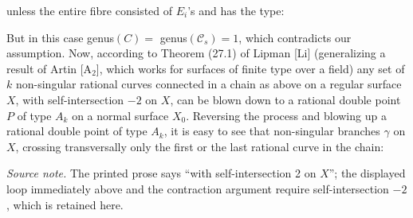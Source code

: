 \documentclass[10pt]{article}
\begin{document}
\begin{center}
\end{center}

unless the entire fibre consisted of $E_i$'s and has the type:

\begin{center}
\end{center}

But in this case genus$(C)=$ genus$(\mathscr C_s)=1$, which contradicts our assumption. Now, according to Theorem (27.1) of Lipman [Li] (generalizing a result of Artin [A$_2$], which works for surfaces of finite type over a field) any set of $k$ non-singular rational curves connected in a chain as above on a regular surface $X$, with self-intersection $-2$ on $X$, can be blown down to a rational double point $P$ of type $A_k$ on a normal surface $X_0$. Reversing the process and blowing up a rational double point of type $A_k$, it is easy to see that non-singular branches $\gamma$ on $X$, crossing transversally only the first or the last rational curve in the chain:

\noindent\emph{Source note.} The printed prose says ``with self-intersection 2 on $X$''; the displayed loop immediately above and the contraction argument require self-intersection $-2$, which is retained here.
\end{document}
